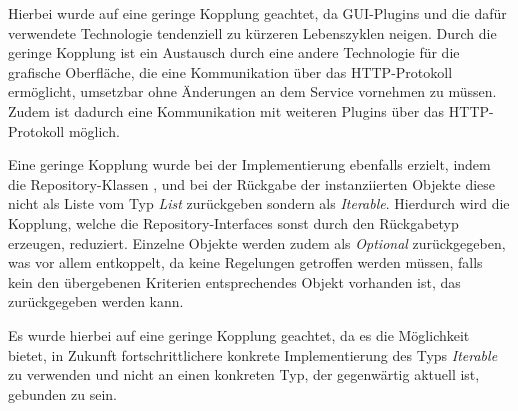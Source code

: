 Hierbei wurde auf eine geringe Kopplung geachtet, da \ac{GUI}-Plugins und die dafür verwendete Technologie tendenziell zu kürzeren Lebenszyklen neigen.
Durch die geringe Kopplung ist ein Austausch durch eine andere Technologie für die grafische Oberfläche, die eine Kommunikation über das \ac{HTTP}-Protokoll ermöglicht, umsetzbar ohne Änderungen an dem Service vornehmen zu müssen.
Zudem ist dadurch eine Kommunikation mit weiteren Plugins über das \ac{HTTP}-Protokoll möglich.

Eine geringe Kopplung wurde bei der Implementierung ebenfalls erzielt, indem die Repository-Klassen \href{https://github.com/lucasmerkel/dhbw-advancedswe-programmentwurf/blob/5764d7da4cfd0562ed8e96128e92f85c30b7309d/swe_programmentwurf/consumergoods-inventory-planner/3-cip-domain/src/main/java/de/dhbw/cip/domain/ConsumerGoodsRepository.java}{}, \href{https://github.com/lucasmerkel/dhbw-advancedswe-programmentwurf/blob/5764d7da4cfd0562ed8e96128e92f85c30b7309d/swe_programmentwurf/consumergoods-inventory-planner/3-cip-domain/src/main/java/de/dhbw/cip/domain/FridgeRepository.java}{} und \href{https://github.com/lucasmerkel/dhbw-advancedswe-programmentwurf/blob/5764d7da4cfd0562ed8e96128e92f85c30b7309d/swe_programmentwurf/consumergoods-inventory-planner/3-cip-domain/src/main/java/de/dhbw/cip/domain/FoodShelfRepository.java}{} bei der Rückgabe der instanziierten Objekte diese nicht als Liste vom Typ \textit{List} zurückgeben sondern als \textit{Iterable}.
Hierdurch wird die Kopplung, welche die Repository-Interfaces sonst durch den Rückgabetyp erzeugen, reduziert.
Einzelne Objekte werden zudem als \textit{Optional} zurückgegeben, was vor allem entkoppelt, da keine Regelungen getroffen werden müssen, falls kein den übergebenen Kriterien entsprechendes Objekt vorhanden ist, das zurückgegeben werden kann.

Es wurde hierbei auf eine geringe Kopplung geachtet, da es die Möglichkeit bietet, in Zukunft fortschrittlichere konkrete Implementierung des Typs \textit{Iterable} zu verwenden und nicht an einen konkreten Typ, der gegenwärtig aktuell ist, gebunden zu sein.

